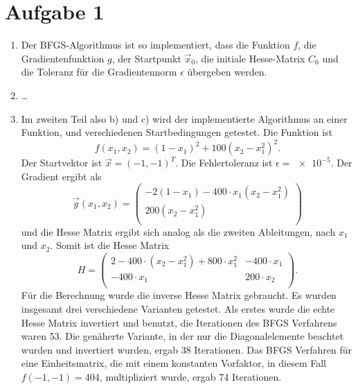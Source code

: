 \section*{Aufgabe 1}

\begin{enumerate}[label=\alph*)]

\item Der BFGS-Algorithmus ist so implementiert, dass die Funktion $f$, die Gradientenfunktion $g$, der Startpunkt $\vec x_0$, die initiale Hesse-Matrix $C_0$ und die Toleranz für die Gradientennorm $\epsilon$ übergeben werden.
\item \dots
\item Im zweiten Teil also b) und c) wird der implementierte Algorithmus an einer Funktion, und verschiedenen Startbedingungen getestet.
Die Funktion ist
\begin{equation*}
    f(x_1, x_2) = (1- x_1)^2 + 100(x_2 - x_1^2)^2.
\end{equation*}
Der Startvektor ist $\vec x = (-1,-1)^T$. Die Fehlertoleranz ist $\epsilon = \num{e-5}$. 
Der Gradient ergibt als 
\begin{equation*}
    \vec g(x_1, x_2) = \begin{pmatrix*}
        -2 (1-x_1) - 400 \cdot x_1 (x_2 - x_1^2) \\
        200 (x_2 - x_1^2) \\
    \end{pmatrix*}
\end{equation*}
und die Hesse Matrix ergibt sich analog als die zweiten Ableitungen, nach $x_1$ und $x_2$.
Somit ist die Hesse Matrix 
\begin{equation*}
    H = \begin{pmatrix*}
        2 - 400 \cdot(x_2 - x_1^2) + 800\cdot x_1^2 & - 400 \cdot x_1 \\
        -400 \cdot x_1 & 200 \cdot x_2 \\
    \end{pmatrix*}.
\end{equation*}
Für die Berechnung wurde die inverse Hesse Matrix gebraucht. Es wurden insgesamt drei verschiedene Varianten getestet. 
Als erstes wurde die echte Hesse Matrix invertiert und benutzt, die Iterationen des BFGS Verfahrens waren \num{53}. Die genäherte Variante, in der nur die Diagonalelemente beachtet wurden und invertiert wurden, ergab \num{38} Iterationen. Das BFGS Verfahren für eine Einheitsmatrix, die mit einem konstanten Vorfaktor, in diesem Fall $f(-1,-1) = 404$, multipliziert wurde, ergab \num{74} Iterationen.

\end{enumerate}
